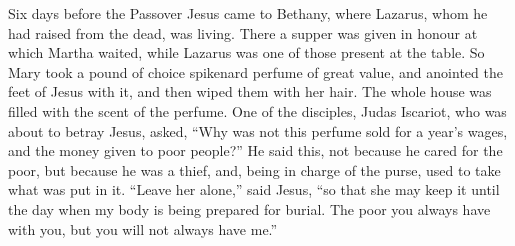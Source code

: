  Six days before the Passover Jesus came to Bethany, where
Lazarus, whom he had raised from the dead, was living. 
There a supper was given in honour at which Martha waited, while Lazarus
was one of those present at the table.  So Mary took a pound
of choice spikenard perfume of great value, and anointed the feet of
Jesus with it, and then wiped them with her hair. The whole house was
filled with the scent of the perfume.  One of the disciples,
Judas Iscariot, who was about to betray Jesus, asked,  ``Why
was not this perfume sold for a year's wages, and the money given to
poor people?''  He said this, not because he cared for the
poor, but because he was a thief, and, being in charge of the purse,
used to take what was put in it.  ``Leave her alone,'' said
Jesus, ``so that she may keep it until the day when my body is being
prepared for burial.  The poor you always have with you, but
you will not always have me.''


